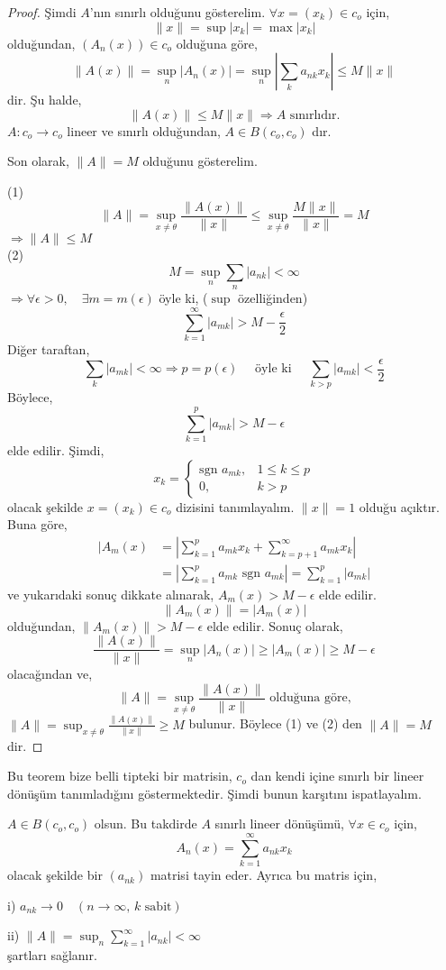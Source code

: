 \begin{proof}
Şimdi $A$'nın sınırlı olduğunu gösterelim. $\forall x=(x_k)\in c_o$ için,
$$
\|x\|=\sup|x_k|=\max|x_k| 
$$
olduğundan, $(A_n(x))\in c_o$ olduğuna göre,
$$
\|A(x)\|=\sup_n|A_n(x)|=\sup_n\left|\sum\limits_ka_{nk}x_k\right|\leq M\|x\|
$$
dir. Şu halde,
$$
\|A(x)\|\leq M\|x\|\Rightarrow A\text{ sınırlıdır.}
$$
$A:c_o\to c_o$ lineer ve sınırlı olduğundan, $A\in B(c_o,c_o)$ dır.\

Son olarak, $\|A\|=M$ olduğunu gösterelim.

(1) $$\|A\|=\sup\limits_{x\neq\theta}\frac{\|A(x)\|}{\|x\|}\leq\sup\limits_{x\neq\theta}\frac{M\|x\|}{\|x\|}=M$$ $\Rightarrow\|A\|\leq M$\\

(2) $$M=\sup\limits_n\sum\limits_n|a_{nk}|<\infty$$
$\Rightarrow\forall\epsilon>0,\quad\exists m=m(\epsilon)$ öyle ki, ($\sup$ özelliğinden)
$$
\sum\limits_{k=1}^\infty|a_{mk}|>M-\frac{\epsilon}{2}
$$
Diğer taraftan, 
$$
\sum_k|a_{mk}|<\infty\Rightarrow p=p(\epsilon)\quad\text{ öyle ki }\quad\sum_{k>p}|a_{mk}|<\frac{\epsilon}{2}
$$
Böylece,
$$
\sum\limits_{k=1}^p|a_{mk}|>M-\epsilon
$$
elde edilir. Şimdi, 
$$x_k=
\begin{cases}
\text{sgn } a_{mk}, & 1\leq k\leq p\\
0, & k>p
\end{cases}
$$
olacak şekilde $x=(x_k)\in c_o$ dizisini tanımlayalım. $\|x\|=1$ olduğu açıktır. Buna göre,
$$\begin{aligned}
|A_m(x)&=\left|\sum\limits_{k=1}^pa_{mk}x_k+\sum\limits_{k=p+1}^\infty a_{mk}x_k\right|\\
&=\left|\sum\limits_{k=1}^pa_{mk}\text{ sgn }a_{mk}\right|=\sum\limits_{k=1}^p|a_{mk}|
\end{aligned}$$
ve yukarıdaki sonuç dikkate alınarak, $A_m(x)>M-\epsilon$ elde edilir. $$\|A_m(x)\|=|A_m(x)|$$ olduğundan, $\|A_m(x)\|>M-\epsilon$ elde edilir. Sonuç olarak,
$$
\frac{\|A(x)\|}{\|x\|}=\sup_{n}|A_n(x)|\geq|A_m(x)|\geq M-\epsilon
$$
olacağından ve,
$$
\|A\|=\sup_{x\neq\theta}\frac{\|A(x)\|}{\|x\|}\text{ olduğuna göre,}
$$
$\|A\|=\sup_{x\neq\theta}\frac{\|A(x)\|}{\|x\|}\geq M$ bulunur. Böylece (1) ve (2) den $\|A\|=M$ dir.
\end{proof}

Bu teorem bize belli tipteki bir matrisin, $c_o$ dan kendi içine sınırlı bir lineer dönüşüm tanımladığını göstermektedir. Şimdi bunun karşıtını ispatlayalım.

\begin{theorem}
$A\in B(c_o,c_o)$ olsun. Bu takdirde $A$ sınırlı lineer dönüşümü, $\forall x\in c_o$ için,
$$
A_n(x)=\sum\limits_{k=1}^\infty a_{nk}x_k
$$
olacak şekilde bir $(a_{nk})$ matrisi tayin eder. Ayrıca bu matris için,
\item[i)] $a_{nk}\to 0\quad(n\to\infty,\, k\text{ sabit})$
\item [ii)] $\|A\|=\sup_n\sum\limits_{k=1}^\infty|a_{nk}|<\infty$\\
şartları sağlanır.
\end{theorem}

